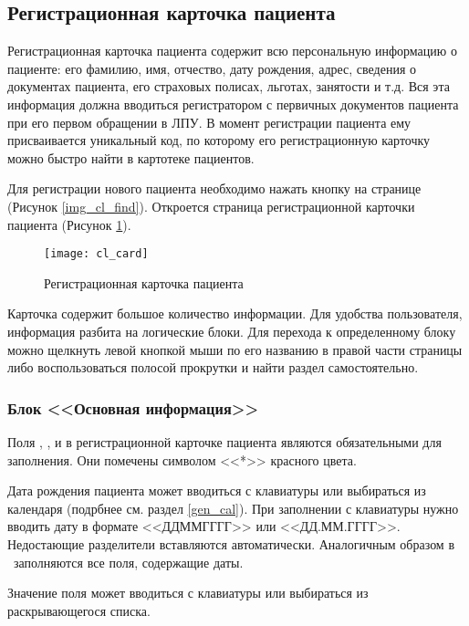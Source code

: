 {
\subsection{Регистрационная карточка пациента} \label{cl_card}

Регистрационная карточка пациента содержит всю персональную информацию о пациенте: его фамилию, имя, отчество, дату рождения, адрес, сведения о документах пациента, его страховых полисах, льготах, занятости и т.д. Вся эта информация должна вводиться регистратором с первичных документов пациента при его первом обращении в ЛПУ. В момент регистрации пациента ему присваивается уникальный код, по которому его регистрационную карточку можно быстро найти в картотеке пациентов.

Для регистрации нового пациента необходимо нажать  кнопку  на странице  (Рисунок \ref{img_cl_find}). Откроется страница регистрационной карточки пациента (Рисунок \ref{img_cl_card}). 

\begin{figure}[!ht]\centering
 \texttt{[image: cl\_card]}
 \caption{Регистрационная карточка пациента}
 \label{img_cl_card}
\end{figure} 

Карточка содержит большое количество информации. Для удобства пользователя, информация разбита на логические блоки. Для перехода к определенному блоку можно щелкнуть левой кнопкой мыши по его названию в правой части страницы либо воспользоваться полосой прокрутки и найти раздел самостоятельно.  

\subsubsection{Блок <<Основная информация>>}

Поля , ,  и  в регистрационной карточке пациента являются обязательными для заполнения. Они помечены символом <<*>> красного цвета.

Дата рождения пациента может вводиться  с клавиатуры или выбираться из календаря (подрбнее см. раздел \ref{gen_cal}). При заполнении с клавиатуры нужно вводить дату в формате <<ДДММГГГГ>> или <<ДД.ММ.ГГГГ>>. Недостающие разделители вставляются автоматически. Аналогичным образом в \tmis~заполняются все поля, содержащие даты.

Значение поля  может вводиться с клавиатуры или выбираться из раскрывающегося списка. 

}
